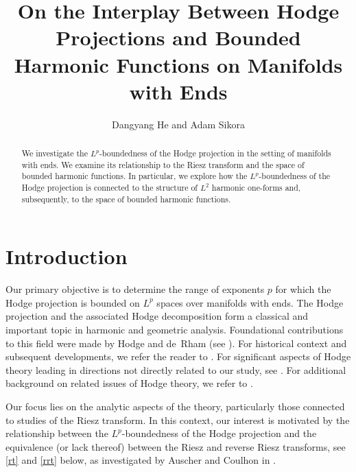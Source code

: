 \documentclass[12pt]{amsart}
\title[ Hodge Projections and Bounded Harmonic Functions on Manifolds with Ends]{On the Interplay Between Hodge Projections and Bounded Harmonic Functions on Manifolds with Ends}
\begin{document}
\author{Dangyang He and  Adam Sikora}
\address{
Dangyang He, School of Mathematical and Physical Sciences, Macquarie University, NSW 2109, Australia}
\address{
Adam Sikora, School of Mathematical and Physical Sciences, Macquarie University, NSW 2109, Australia}

\begin{abstract}
We investigate the $L^p$-boundedness of the Hodge projection in the setting of manifolds with ends. We examine its relationship to the Riesz transform and the space of bounded harmonic functions. In particular, we explore how the 
$L^p$-boundedness of the Hodge projection is connected to the structure of
$L^2$ harmonic one-forms and, subsequently, to the space of bounded harmonic functions.
\end{abstract}

\maketitle

\section{Introduction}





Our primary objective is to determine the range of exponents \(p\) for which the Hodge 
projection is bounded on \(L^p\) spaces over manifolds with ends. The Hodge projection and 
the associated Hodge decomposition form a classical and important topic in harmonic and 
geometric analysis. Foundational contributions to this field were made by Hodge and de~Rham 
(see \cite{DeRham, Hodge}). For historical context and subsequent developments, we refer the 
reader to \cite{Carron1, hode}. For significant aspects of Hodge theory leading in directions 
not directly related to our study, see \cite{ABP,Simpson}. For additional background on 
related issues of Hodge theory, we refer to \cite{Carron1, Li2,Li1}.

Our focus lies on the analytic aspects of the theory, particularly those connected to studies 
of the Riesz transform. In this context, our interest is motivated by the relationship between 
the \(L^p\)-boundedness of the Hodge projection and the equivalence (or lack thereof) between 
the Riesz and reverse Riesz transforms, see \eqref{rt} and  \eqref{rrt} below, as investigated by Auscher and Coulhon in \cite{AC}.
\end{document}
